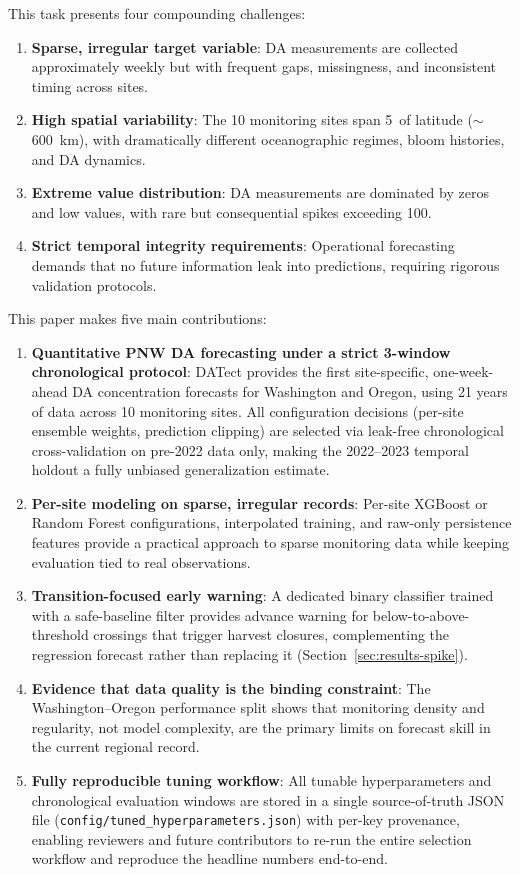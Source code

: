 \documentclass[toxins,article,submit,moreauthors]{Definitions/mdpi}
\begin{document}
This task presents four compounding challenges:
\begin{enumerate}[nosep]
    \item \textbf{Sparse, irregular target variable}: DA measurements are collected approximately weekly but with frequent gaps, missingness, and inconsistent timing across sites.
    \item \textbf{High spatial variability}: The 10 monitoring sites span 5\textdegree\ of latitude ($\sim$\SI{600}{\kilo\meter}), with dramatically different oceanographic regimes, bloom histories, and DA dynamics.
    \item \textbf{Extreme value distribution}: DA measurements are dominated by zeros and low values, with rare but consequential spikes exceeding \SI{100}{\microgrampeg}.
    \item \textbf{Strict temporal integrity requirements}: Operational forecasting demands that no future information leak into predictions, requiring rigorous validation protocols.
\end{enumerate}

This paper makes five main contributions:
\begin{enumerate}[nosep]
    \item \textbf{Quantitative PNW DA forecasting under a strict 3-window chronological protocol}: DATect provides the first site-specific, one-week-ahead DA concentration forecasts for Washington and Oregon, using 21 years of data across 10 monitoring sites. All configuration decisions (per-site ensemble weights, prediction clipping) are selected via leak-free chronological cross-validation on pre-2022 data only, making the 2022--2023 temporal holdout a fully unbiased generalization estimate.
    \item \textbf{Per-site modeling on sparse, irregular records}: Per-site XGBoost or Random Forest configurations, interpolated training, and raw-only persistence features provide a practical approach to sparse monitoring data while keeping evaluation tied to real observations.
    \item \textbf{Transition-focused early warning}: A dedicated binary classifier trained with a safe-baseline filter provides advance warning for below-to-above-threshold crossings that trigger harvest closures, complementing the regression forecast rather than replacing it (Section~\ref{sec:results-spike}).
    \item \textbf{Evidence that data quality is the binding constraint}: The Washington--Oregon performance split shows that monitoring density and regularity, not model complexity, are the primary limits on forecast skill in the current regional record.
    \item \textbf{Fully reproducible tuning workflow}: All tunable hyperparameters and chronological evaluation windows are stored in a single source-of-truth JSON file (\texttt{config/tuned\_hyperparameters.json}) with per-key provenance, enabling reviewers and future contributors to re-run the entire selection workflow and reproduce the headline numbers end-to-end.
\end{enumerate}
\end{document}
